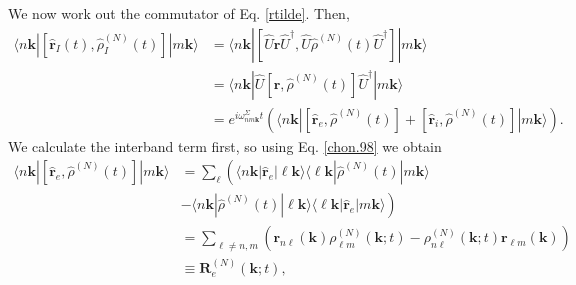 We now work out the commutator of Eq. \eqref{rtilde}. Then,
\begin{align}\label{conmu1}
\langle n\mathbf{k}|
[\hat{\mathbf{r}}_I(t),\hat{\rho}^{(N)}_I(t)]
|m\mathbf{k}\rangle
&=
\langle n\mathbf{k}|
[\hat{U}\hat{\mathbf{r}}\hat{U}^\dagger,\hat{U}\hat{\rho}^{(N)}(t)\hat{U}^\dagger]
|m\mathbf{k}\rangle
\nonumber \\
&=
\langle n\mathbf{k}|
\hat{U}[\hat{\mathbf{r}},\hat{\rho}^{(N)}(t)]\hat{U}^\dagger
|m\mathbf{k}\rangle
\\
&=
e^{i\omega^\Sigma_{nm\mathbf{k}}t}
\left(
\langle n\mathbf{k}|
[\hat{\mathbf{r}}_e,\hat{\rho}^{(N)}(t)]
+
[\hat{\mathbf{r}}_i,\hat{\rho}^{(N)}(t)]
|m\mathbf{k}\rangle
\right)
\nonumber
.
\end{align}
We calculate the interband term first, so using Eq. \eqref{chon.98} we obtain
\begin{align}\label{conmu2}
\langle n\mathbf{k}|
[\hat{\mathbf{r}}_e,\hat{\rho}^{(N)}(t)]
|m\mathbf{k}\rangle
&=
\sum_{\ell}
\left(
\langle n\mathbf{k}|
\hat{\mathbf{r}}_e
|\ell\mathbf{k}\rangle
\langle \ell\mathbf{k}|
\hat{\rho}^{(N)}(t)
|m\mathbf{k}\rangle
\right.
\nonumber \\
&
\left.
-
\langle n\mathbf{k}|
\hat{\rho}^{(N)}(t)
|\ell\mathbf{k}\rangle
\langle \ell\mathbf{k}|
\hat{\mathbf{r}}_e
|m\mathbf{k}\rangle
\right)
\nonumber \\
&=
\sum_{\ell\ne n,m}
\left(
\mathbf{r}_{n\ell}(\mathbf{k})
\rho^{(N)}_{\ell m}(\mathbf{k};t)
-
\rho^{(N)}_{n\ell}(\mathbf{k};t)
\mathbf{r}_{\ell m}(\mathbf{k})
\right)
\nonumber\\
&\equiv
\mathbf{R}^{(N)}_e(\mathbf{k};t)
,
\end{align}

